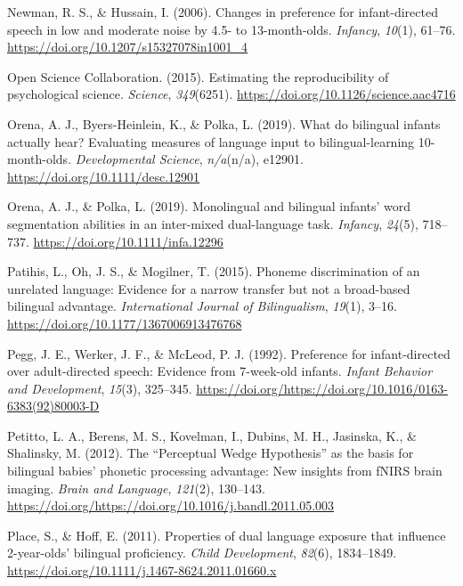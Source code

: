 \documentclass[english,,man,floatsintext]{apa6}
\begin{document}
\leavevmode\hypertarget{ref-newman_2006}{}%
Newman, R. S., \& Hussain, I. (2006). Changes in preference for infant-directed speech in low and moderate noise by 4.5- to 13-month-olds. \emph{Infancy}, \emph{10}(1), 61--76. \url{https://doi.org/10.1207/s15327078in1001_4}

\leavevmode\hypertarget{ref-open_science_collab_2015}{}%
Open Science Collaboration. (2015). Estimating the reproducibility of psychological science. \emph{Science}, \emph{349}(6251). \url{https://doi.org/10.1126/science.aac4716}

\leavevmode\hypertarget{ref-orena_2019}{}%
Orena, A. J., Byers-Heinlein, K., \& Polka, L. (2019). What do bilingual infants actually hear? Evaluating measures of language input to bilingual-learning 10-month-olds. \emph{Developmental Science}, \emph{n/a}(n/a), e12901. \url{https://doi.org/10.1111/desc.12901}

\leavevmode\hypertarget{ref-orena_polka_2019}{}%
Orena, A. J., \& Polka, L. (2019). Monolingual and bilingual infants' word segmentation abilities in an inter-mixed dual-language task. \emph{Infancy}, \emph{24}(5), 718--737. \url{https://doi.org/10.1111/infa.12296}

\leavevmode\hypertarget{ref-patihis_2015}{}%
Patihis, L., Oh, J. S., \& Mogilner, T. (2015). Phoneme discrimination of an unrelated language: Evidence for a narrow transfer but not a broad-based bilingual advantage. \emph{International Journal of Bilingualism}, \emph{19}(1), 3--16. \url{https://doi.org/10.1177/1367006913476768}

\leavevmode\hypertarget{ref-pegg_1992}{}%
Pegg, J. E., Werker, J. F., \& McLeod, P. J. (1992). Preference for infant-directed over adult-directed speech: Evidence from 7-week-old infants. \emph{Infant Behavior and Development}, \emph{15}(3), 325--345. \url{https://doi.org/https://doi.org/10.1016/0163-6383(92)80003-D}

\leavevmode\hypertarget{ref-petitto_2012}{}%
Petitto, L. A., Berens, M. S., Kovelman, I., Dubins, M. H., Jasinska, K., \& Shalinsky, M. (2012). The ``Perceptual Wedge Hypothesis'' as the basis for bilingual babies' phonetic processing advantage: New insights from fNIRS brain imaging. \emph{Brain and Language}, \emph{121}(2), 130--143. \url{https://doi.org/https://doi.org/10.1016/j.bandl.2011.05.003}

\leavevmode\hypertarget{ref-place_2011}{}%
Place, S., \& Hoff, E. (2011). Properties of dual language exposure that influence 2-year-olds' bilingual proficiency. \emph{Child Development}, \emph{82}(6), 1834--1849. \url{https://doi.org/10.1111/j.1467-8624.2011.01660.x}
\end{document}

